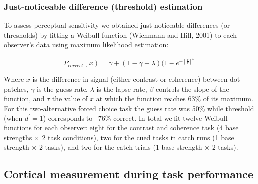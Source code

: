 \documentclass{report}
\begin{document}
\subsubsection{Just-noticeable difference (threshold) estimation}

To assess perceptual sensitivity we obtained just-noticeable differences (or thresholds) by fitting a Weibull function (Wichmann and Hill, 2001) to each observer’s data using maximum likelihood estimation:

\begin{equation}
    P_{correct}(x) = \gamma + (1 - \gamma - \lambda)(1 - e^{- [\frac{x}{\tau}]^{\beta}}
\end{equation}

Where $x$ is the difference in signal (either contrast or coherence) between dot patches, $\gamma$ is the guess rate, $\lambda$ is the lapse rate, $\beta$ controls the slope of the function, and $\tau$ the value of $x$ at which the function reaches 63\% of its maximum. For this two-alternative forced choice task the guess rate was 50\% while threshold (when $d^'=1$) corresponds to ~76\% correct. In total we fit twelve Weibull functions for each observer: eight for the contrast and coherence task (4 base strengths $\times$ 2 task conditions), two for the cued tasks in catch runs (1 base strength $\times$ 2 tasks), and two for the catch trials (1 base strength $\times$ 2 tasks).

\subsection{Cortical measurement during task performance}
\end{document}
